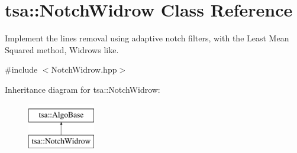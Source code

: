 \hypertarget{classtsa_1_1_notch_widrow}{}\section{tsa\+:\+:Notch\+Widrow Class Reference}
\label{classtsa_1_1_notch_widrow}


Implement the lines removal using adaptive notch filters, with the Least Mean Squared method, Widrow\textquotesingle{}s like.  




{\ttfamily \#include $<$Notch\+Widrow.\+hpp$>$}

Inheritance diagram for tsa\+:\+:Notch\+Widrow\+:\begin{figure}[H]
\begin{center}
\leavevmode
\includegraphics[height=2.000000cm]{classtsa_1_1_notch_widrow}
\end{center}
\end{figure}
